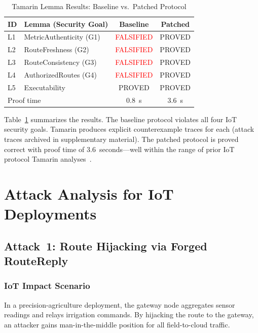 \documentclass[10pt,journal,compsoc]{IEEEtran}
\begin{document}
\begin{table}[t]
  \centering
  \caption{Tamarin Lemma Results: Baseline vs.\ Patched Protocol}
  \label{tab:tamarin}
  \begin{tabular}{llcc}
    \toprule
    \textbf{ID} & \textbf{Lemma (Security Goal)} &
      \textbf{Baseline} & \textbf{Patched} \\
    \midrule
    L1 & MetricAuthenticity (G1) & \textcolor{red}{FALSIFIED} & \textcolor{green!60!black}{PROVED} \\
    L2 & RouteFreshness (G2)     & \textcolor{red}{FALSIFIED} & \textcolor{green!60!black}{PROVED} \\
    L3 & RouteConsistency (G3)   & \textcolor{red}{FALSIFIED} & \textcolor{green!60!black}{PROVED} \\
    L4 & AuthorizedRoutes (G4)   & \textcolor{red}{FALSIFIED} & \textcolor{green!60!black}{PROVED} \\
    L5 & Executability           & \textcolor{green!60!black}{PROVED}  & \textcolor{green!60!black}{PROVED} \\
    \midrule
    \multicolumn{2}{l}{Proof time} & 0.8~s & 3.6~s \\
    \bottomrule
  \end{tabular}
\end{table}

Table~\ref{tab:tamarin} summarizes the results. The baseline protocol
violates all four IoT security goals. Tamarin produces explicit
counterexample traces for each (attack traces archived in supplementary
material). The patched protocol is proved correct with proof time of
3.6~seconds—well within the range of prior IoT protocol Tamarin
analyses~\cite{ieee2025-kang-tamarin,ieee2025-5g-prose-aka,pereira2025-router-verification,zenodo2025-formal-methods-comparison}.

\section{Attack Analysis for IoT Deployments}
\label{sec:attacks}

\subsection{Attack~1: Route Hijacking via Forged RouteReply}

\subsubsection{IoT Impact Scenario}
In a precision-agriculture deployment, the gateway node aggregates
sensor readings and relays irrigation commands. By hijacking the
route to the gateway, an attacker gains man-in-the-middle
position for all field-to-cloud traffic.
\end{document}
